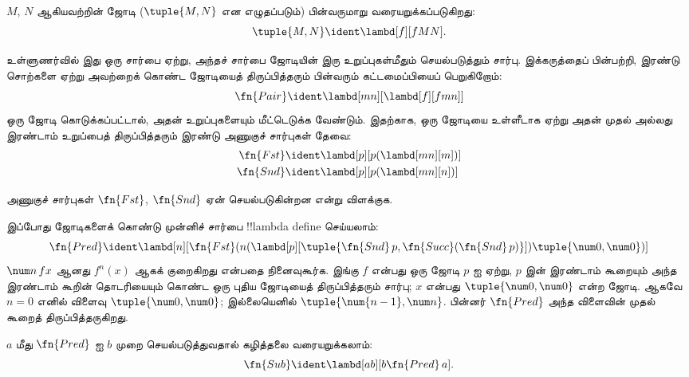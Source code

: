 \documentclass[../../../include/open-logic-section]{subfiles}
\begin{document}

\begin{defn}
$M$, $N$ ஆகியவற்றின் ஜோடி ($\tuple{M,N}$ என எழுதப்படும்) பின்வருமாறு
வரையறுக்கப்படுகிறது:
\[
\tuple{M,N} \ident \lambd[f][fMN].
\]
\end{defn}

உள்ளுணர்வில் இது ஒரு சார்பை ஏற்று, அந்தச் சார்பை ஜோடியின் இரு உறுப்புகள்மீதும்
செயல்படுத்தும் சார்பு. இக்கருத்தைப் பின்பற்றி, இரண்டு சொற்களை ஏற்று அவற்றைக்
கொண்ட ஜோடியைத் திருப்பித்தரும் பின்வரும் கட்டமைப்பியைப் பெறுகிறோம்:
\[
  \fn{Pair} \ident \lambd[mn][\lambd[f][fmn]]
\]
ஒரு ஜோடி கொடுக்கப்பட்டால், அதன் உறுப்புகளையும் மீட்டெடுக்க வேண்டும்.
இதற்காக, ஒரு ஜோடியை உள்ளீடாக ஏற்று அதன் முதல் அல்லது இரண்டாம் உறுப்பைத்
திருப்பித்தரும் இரண்டு அணுகுச் சார்புகள் தேவை:
\begin{align*}
  \fn{Fst} & \ident \lambd[p][p(\lambd[mn][m])]\\
  \fn{Snd} & \ident \lambd[p][p(\lambd[mn][n])]
\end{align*}

\begin{prob}
  அணுகுச் சார்புகள் $\fn{Fst}$, $\fn{Snd}$ ஏன் செயல்படுகின்றன என்று
  விளக்குக.
\end{prob}

இப்போது ஜோடிகளைக் கொண்டு முன்னிச் சார்பை !!{lambda define} செய்யலாம்:
\[
  \fn{Pred} \ident \lambd[n][\fn{Fst}(n (\lambd[p][\tuple{\fn{Snd}\, {p}, \fn{Succ}(\fn{Snd}\, {p})}]) \tuple{\num 0, \num 0})]
\]
$\num n\, f x$ ஆனது $f^{n}(x)$ ஆகக் குறைகிறது என்பதை நினைவுகூர்க. இங்கு
$f$ என்பது ஒரு ஜோடி $p$ ஐ ஏற்று, $p$ இன் இரண்டாம் கூறையும் அந்த இரண்டாம்
கூறின் தொடரியையும் கொண்ட ஒரு புதிய ஜோடியைத் திருப்பித்தரும் சார்பு;
$x$ என்பது $\tuple{\num 0,\num 0}$ என்ற ஜோடி. ஆகவே $n=0$ எனில் விளைவு
$\tuple{\num 0,\num 0}$; இல்லையெனில்
$\tuple{\num{n-1}, \num n}$. பின்னர் $\fn{Pred}$ அந்த விளைவின் முதல்
கூறைத் திருப்பித்தருகிறது.

$a$ மீது $\fn{Pred}$ ஐ $b$ முறை செயல்படுத்துவதால் கழித்தலை வரையறுக்கலாம்:
\[
\fn{Sub} \ident \lambd[ab][b \fn{Pred}\, a].
\]
\end{document}
